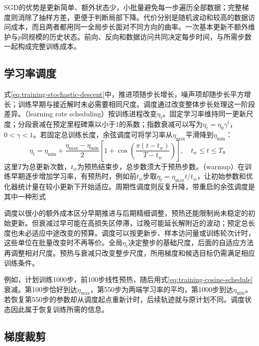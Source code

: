 SGD的优势是更新简单、额外状态少，小批量避免每一步遍历全部数据；完整梯度则消除了抽样方差，更便于判断局部下降。代价分别是随机波动和较高的数据访问成本，而且两者都用同一全局步长面对不同方向的曲率。一次基本更新不额外维护与$p$同规模的历史状态。前向、反向和数据访问共同决定每步时间，与所需步数一起构成完整训练成本。

\subsection{学习率调度}
\label{sec:training-schedules}

式\eqref{eq:training-stochastic-descent}中，推进项随步长增长，噪声项却随步长平方增长；训练早期与接近解时未必需要相同尺度。调度通过改变整体步长处理这一阶段差异。（learning rate scheduling）按训练进程改变$\eta_t$。固定学习率维持同一更新尺度；分段衰减在预定里程碑乘以小于1的系数；指数衰减可以写为$\eta_t=\eta_0\gamma^t$，$0<\gamma<1$。若固定总训练长度，余弦调度可将学习率从$\eta_{\max}$平滑降到$\eta_{\min}$：
\begin{equation}
  \eta_t=\eta_{\min}+\frac{\eta_{\max}-\eta_{\min}}2
  \left[1+\cos\left(\frac{\pi(t-t_w)}{T-t_w}\right)\right],
  \quad t_w\leq t\leq T\text{。}
  \label{eq:training-cosine-schedule}
\end{equation}
这里$T$为总更新次数，$t_w$为预热结束步，总步数须大于预热步数。（warmup）在训练早期逐步增加学习率，有预热时，例如前$t_w$步取$\eta_t=\eta_{\max}t/t_w$，让初始参数和优化器统计量在较小更新下开始适应。周期性调度则反复升降，带重启的余弦调度是其中一种形式

调度以很小的额外成本区分早期推进与后期精细调整，预热还能限制尚未稳定的初始更新。但衰减过早可能在高损失区停滞，过晚可能延长解附近的波动；预定总长度也未必适应中途改变的预算。调度可以按更新步、样本访问量或训练轮次计时，这些单位在批量改变时不再等价。全局$\eta_t$决定整步的基础尺度，后面的自适应方法再调整相对尺度。预热与衰减只改变整步尺度，所用梯度和候选目标仍需满足相应训练条件。

例如，计划训练1000步，前100步线性预热，随后用式\eqref{eq:training-cosine-schedule}衰减。第100步恰好到达$\eta_{\max}$，第550步为两端学习率的平均，第1000步到达$\eta_{\min}$。若恢复第550步的参数却从调度起点重新计时，后续轨迹就与原计划不同。调度状态因此属于恢复训练所需的信息。

\subsection{梯度裁剪}
\label{sec:training-gradient-modification}

